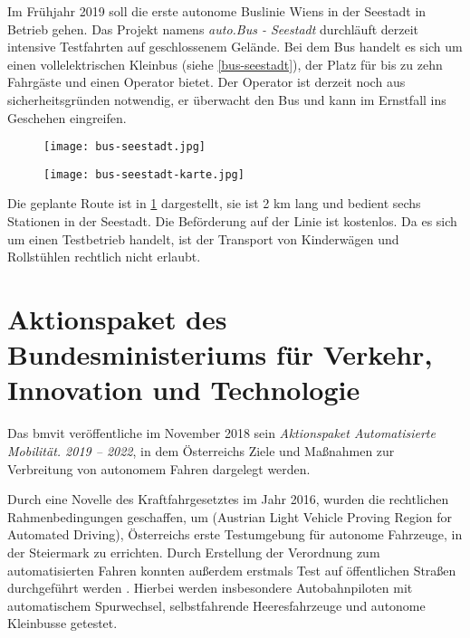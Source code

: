 Im Frühjahr 2019 soll die erste autonome Buslinie Wiens in der Seestadt in Betrieb gehen. Das Projekt namens \emph{auto.Bus - Seestadt} durchläuft derzeit intensive Testfahrten auf geschlossenem Gelände. Bei dem Bus handelt es sich um einen vollelektrischen Kleinbus (siehe \ref{bus-seestadt}), der Platz für bis zu zehn Fahrgäste und einen Operator bietet. Der Operator ist derzeit noch aus sicherheitsgründen notwendig, er überwacht den Bus und kann im Ernstfall ins Geschehen eingreifen. 

\begin{figure}\centering
  \texttt{[image: bus-seestadt.jpg]}
  \label{bus-seestadt}

  \texttt{[image: bus-seestadt-karte.jpg]}
  \label{bus-seestadt-karte}
\end{figure}

Die geplante Route ist in \ref{bus-seestadt-karte} dargestellt, sie ist 2 \si{\kilo\metre} lang und bedient sechs Stationen in der Seestadt. Die Beförderung auf der Linie ist kostenlos. Da es sich um einen Testbetrieb handelt, ist der Transport von Kinderwägen und Rollstühlen rechtlich nicht erlaubt.


\section{Aktionspaket des Bundesministeriums für Verkehr, Innovation und Technologie}

Das \ac{bmvit} veröffentliche im November 2018 sein \emph{Aktionspaket Automatisierte Mobilität. 2019 -- 2022}, in dem Österreichs Ziele und Maßnahmen zur Verbreitung von autonomem Fahren dargelegt werden.

Durch eine Novelle des Kraftfahrgesetztes im Jahr 2016, wurden die rechtlichen Rahmenbedingungen geschaffen, um  (Austrian Light Vehicle Proving Region for Automated Driving), Österreichs erste Testumgebung für autonome Fahrzeuge, in der Steiermark zu errichten. Durch Erstellung der Verordnung zum automatisierten Fahren konnten außerdem erstmals Test auf öffentlichen Straßen durchgeführt werden . Hierbei werden insbesondere Autobahnpiloten mit automatischem Spurwechsel, selbstfahrende Heeresfahrzeuge und autonome Kleinbusse getestet.

